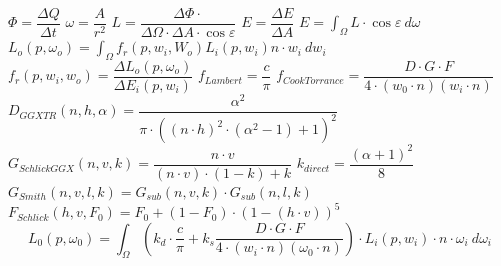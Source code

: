 \documentclass[
  11pt,
  a4paper,
  oneside
  ]{article}
\begin{document}
$\Phi =\dfrac{\Delta Q}{\Delta t}$ %
$\omega =\dfrac{A}{r^{2}}$ %
$L=\dfrac{\Delta \Phi \cdot }{\Delta \Omega \cdot \Delta A\cdot \cos \varepsilon }$ %
$E=\dfrac{\Delta E}{\Delta A}$ %
$E=\int _{\Omega }L\cdot \cos \varepsilon \ d\omega $ %
$L_{o}\left( p,\omega _{o}\right) =\int _{\Omega }f_{r}\left( p,w_{i},W_{o}\right)L_{i}\left( p,w_{i}\right)n\cdot w_{i} \ dw_{i}$ %
$f_{r}\left( p,w_{i},w_{o}\right) =\dfrac{\Delta L_{o}\left( p,\omega _{o}\right) }{\Delta E_{i}\left( p,w_{i}\right) }$ %
$f_{Lambert}=\dfrac{c}{\pi}$ %
$f_{CookTorrance}=\dfrac{D\cdot G\cdot F}{4\cdot \left( w_{0}\cdot n\right) \left( w_{i}\cdot n\right) }$ %
$D_{GGXTR}\left( n,h,\alpha \right) =\dfrac{\alpha ^{2}}{\pi \cdot \left( \left( n\cdot h\right) ^{2}\cdot \left( \alpha ^{2}-1\right) +1\right) ^{2}}$ %
$G_{SchlickGGX}\left( n,v,k\right) =\dfrac{n\cdot v}{\left( n\cdot v\right) \cdot \left( 1-k\right) +k}$ %
$k_{direct}=\dfrac{\left( \alpha +1\right) ^{2}}{8}$ %
$G_{Smith}\left( n,v,l,k\right) =G_{sub}\left( n,v,k\right) \cdot G_{sub}\left( n,l,k\right)$ %
$F_{Schlick}\left( h,v,F_{0}\right) =F_{0}+\left( 1-F_{0}\right) \cdot \left( 1-\left( h\cdot v\right) \right) ^{5}$ %
\[ L_{0}\left( p,\omega _{0}\right) =\int _{\Omega }^{}\left( k_{d}\cdot \dfrac{c}{\pi }+k_{s}\dfrac{D\cdot G\cdot F}{4\cdot \left( w_{i}\cdot n\right) \left( \omega _{0}\cdot n\right) }\right) \cdot L_{i}\left( p,w_{i}\right) \cdot n\cdot \omega _{i} \ d\omega _{i}\] %
\end{document}

